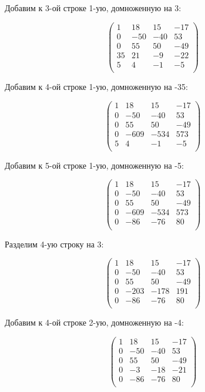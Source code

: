 	Добавим к 3-ой строке 1-ую, домноженную на 3:
	
	\[
	\begin{pmatrix}
	1 & 18 & 15 & -17 \\
	0 & -50 & -40 & 53 \\
	0 & 55 & 50 & -49 \\
	35 & 21 & -9 & -22 \\
	5 & 4 & -1 & -5 \\
	\end{pmatrix}
	\]
	
	Добавим к 4-ой строке 1-ую, домноженную на -35:
	
	\[
	\begin{pmatrix}
	1 & 18 & 15 & -17 \\
	0 & -50 & -40 & 53 \\
	0 & 55 & 50 & -49 \\
	0 & -609 & -534 & 573 \\
	5 & 4 & -1 & -5 \\
	\end{pmatrix}
	\]
	
	Добавим к 5-ой строке 1-ую, домноженную на -5:
	
	\[
	\begin{pmatrix}
	1 & 18 & 15 & -17 \\
	0 & -50 & -40 & 53 \\
	0 & 55 & 50 & -49 \\
	0 & -609 & -534 & 573 \\
	0 & -86 & -76 & 80 \\
	\end{pmatrix}
	\]
	
	Разделим 4-ую строку на 3:
	
	\[
	\begin{pmatrix}
	1 & 18 & 15 & -17 \\
	0 & -50 & -40 & 53 \\
	0 & 55 & 50 & -49 \\
	0 & -203 & -178 & 191 \\
	0 & -86 & -76 & 80 \\
	\end{pmatrix}
	\]
	
	Добавим к 4-ой строке 2-ую, домноженную на -4:
	
	\[
	\begin{pmatrix}
	1 & 18 & 15 & -17 \\
	0 & -50 & -40 & 53 \\
	0 & 55 & 50 & -49 \\
	0 & -3 & -18 & -21 \\
	0 & -86 & -76 & 80 \\
	\end{pmatrix}
	\]
	
